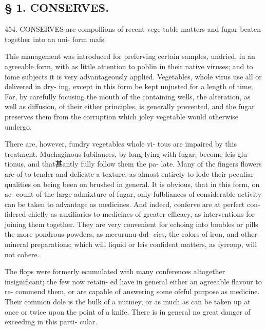 \subsection*{§ 1. CONSERVES.}
454. CONSERVES are compollions of recent vege
table matters and fugar beaten together into an uni-
form mafs.\par\medskip
This management was introduced for preferving
certain samples, undried, in an agreeable form, with
as little attention to poblin in their native viruses;
and to fome subjects it is very advantageously applied.
Vegetables, whole virus use all or delivered in dry-
ing, except in this form be kept unjusted for a length
of time; For, by carefully focusing the mouth of the
containing wells, the alteration, as well as diffusion,
of their either principles, is generally prevented, and
the fugar preserves them from the corruption which
joley vegetable would otherwise undergo.\par\medskip
There are, however, fundry vegetables whole vi-
tous are impaired by this treatment. Muchaginous
fubilances, by long lying with fugar, become leis glu-
tionus, and that甚antly fully follow them the pa-
late. Many of the fingers flowers are of to tender
and delicate a texture, as almost entirely to lode their
peculiar qualities on being been on brushed
in general. It is obvious, that in this form, on ac-
count of the large admixture of fugar, only fulbliances
of considerable activity can be taken to advantage as
medicines. And indeed, conferve are at perfect con-
fidered chiefly as auxiliaries to medicines of greater
efficacy, as interventions for joining them together.
They are very convenient for echoing into boubles or
pills the more pondrous powders, as mecurunu dul-
cies, the colors of iron, and other mineral preparations;
which will liquid or leis confident matters, as fyrroup,
will not cohere.\par\medskip
The flops were formerly ecumulated with many
conferences altogether insignificant; the few now retain-
ed have in general either an agreeable flavour to re-
commend them, or are capable of answering some
ofeful purpose as medicine. Their common dole is
the bulk of a nutmey, or as much as can be taken up
at once or twice upon the point of a knife. There is
in general no great danger of exceeding in this parti-
cular.\par\medskip
